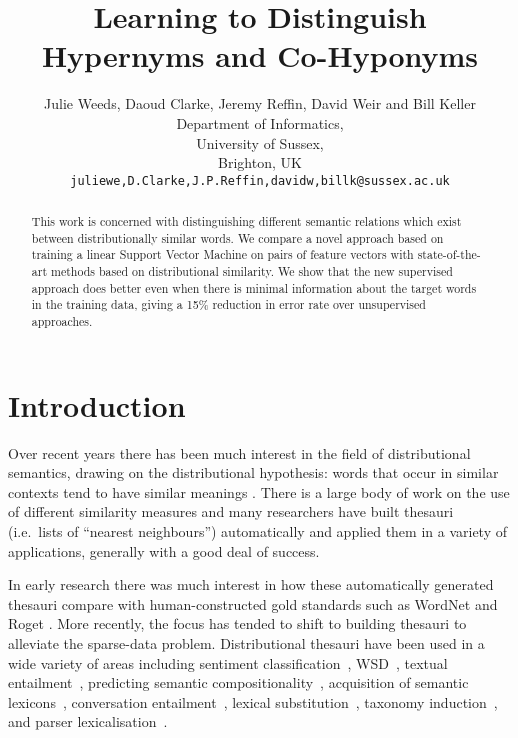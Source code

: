\documentclass[11pt]{article}
\title{Learning to Distinguish Hypernyms and Co-Hyponyms}
\author{Julie Weeds, Daoud Clarke, Jeremy Reffin, David Weir and Bill Keller\\ Department of Informatics,\\ University of Sussex,\\ Brighton, UK\\ {\tt juliewe,D.Clarke,J.P.Reffin,davidw,billk@sussex.ac.uk}}
\date{} %
\begin{document}
\maketitle

\begin{abstract}
This work is concerned with distinguishing different semantic relations which exist between distributionally similar words.  We compare a novel approach based on training a linear Support Vector Machine on pairs of feature vectors with state-of-the-art methods based on distributional similarity. We show that the new supervised approach does better even when there is minimal information about the target words in the training data, giving a 15\% reduction in error rate over unsupervised approaches.

\end{abstract}
\section{Introduction}

Over recent years there has been much interest in the field of distributional semantics, drawing on the distributional hypothesis: words that occur in similar contexts tend to have similar meanings \cite{Harris1954}.   There is a large body of work on the use of different similarity measures \cite{Lee1999,Weeds2003,Curran2004} and many researchers have built thesauri (i.e.~lists of ``nearest neighbours'') automatically and applied them in a variety of applications, generally with a good deal of success.

In early research there was much interest in how these automatically generated thesauri compare with human-constructed gold standards such as WordNet and Roget \cite{Lin1998,Kilgarriff2000}.  More recently, the focus has tended to shift to building thesauri to alleviate the sparse-data problem.  Distributional thesauri have been used in a wide variety of areas including sentiment classification~\cite{Bollegala2011}, WSD~\cite{miller-EtAl:2012:PAPERS,khapra-EtAl:2010:ACL}, textual entailment~\cite{berant-dagan-goldberger:2010:ACL}, predicting semantic compositionality~\cite{bergsma-EtAl:2010:EMNLP}, acquisition of semantic lexicons~\cite{mcintosh:2010:EMNLP}, conversation entailment~\cite{zhang-chai:2010:EMNLP}, lexical substitution~\cite{szarvas-biemann-gurevych:2013:NAACL-HLT}, taxonomy induction~\cite{fountain-lapata:2012:NAACL-HLT}, and parser lexicalisation~\cite{rei-briscoe:2013:NAACL-HLT}.  
\end{document}
